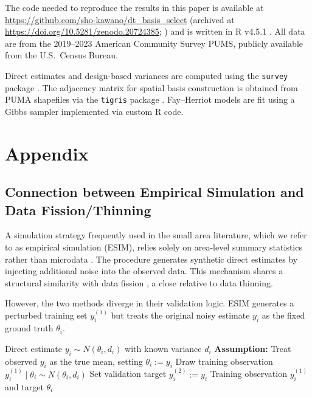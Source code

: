 \documentclass[11pt]{article}
\newcommand{\ytrain}{y^{(1)}}                           %
\newcommand{\ytest}{y^{(2)}}                            %
\newcommand{\N}[2]{N\!\left(#1, #2\right)}
\theoremstyle{plain}
\theoremstyle{definition}
\theoremstyle{remark}
\begin{document}
The code needed to reproduce the results in this paper is available at \url{https://github.com/sho-kawano/dt_basis_select} (archived at \url{https://doi.org/10.5281/zenodo.20724385}; \citealp{kawano_dt_code_2026}) and is written in R v4.5.1 \citep{r_core_team_r_2025}. All data are from
the 2019--2023 American Community Survey PUMS, publicly available from the U.S.\ Census Bureau.

Direct estimates and design-based variances are computed using the \texttt{survey} package \citep{lumley_survey_2024}. The adjacency
matrix for spatial basis construction is obtained from PUMA shapefiles via the \texttt{tigris} package \citep{walker_tigris_2023}. Fay--Herriot models are fit using a Gibbs sampler implemented via custom R code.





\newpage
\section{Appendix}
\subsection{Connection between Empirical Simulation and Data Fission/Thinning}
\label{app:esim}

A simulation strategy frequently used in the small area literature, which we refer to as empirical simulation (ESIM), relies solely on area-level summary statistics rather than microdata \citep{bradley_multivariate_2015, janicki_bayesian_2022}. The procedure generates synthetic direct estimates by injecting additional noise into the observed data. This mechanism shares a structural similarity with data fission \citep{leiner_data_2025}, a close relative to data thinning.

However, the two methods diverge in their validation logic. ESIM generates a perturbed training set $\ytrain_i$ but treats the original noisy estimate $y_i$ as the fixed ground truth $\theta_i$.

\begin{algorithm}[H]
\caption{Empirical Simulation Study (ESIM)}
\label{alg:esim}
\begin{algorithmic}[1]
\Require Direct estimate $y_i \sim \N{\theta_i}{d_i}$ with known variance $d_i$
\State \textbf{Assumption:} Treat observed $y_i$ as the true mean, setting $\theta_i := y_i$
\State Draw training observation $\ytrain_i \mid \theta_i \sim \N{\theta_i}{d_i}$
\State Set validation target $\ytest_i := y_i$
\State \Return Training observation $\ytrain_i$ and target $\theta_i$
\end{algorithmic}
\end{algorithm}
\end{document}
